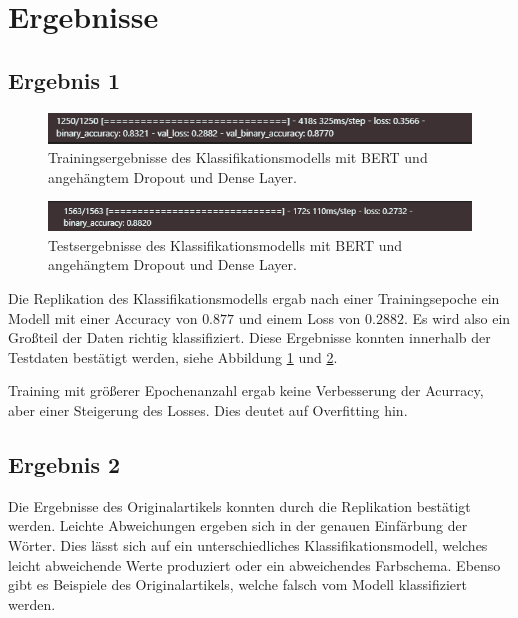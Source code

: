 \documentclass[DIV=13,fontsize=11pt]{scrartcl}
\begin{document}
\section{Ergebnisse}

\subsection{Ergebnis 1}

\begin{figure}[H]
    \centering
    \includegraphics[width=\linewidth]{img/train_time.png}
    \caption{Trainingsergebnisse des Klassifikationsmodells mit BERT und angehängtem Dropout und Dense Layer.}
    \label{fig:modell_train}
\end{figure}

\begin{figure}[H]
    \centering
    \includegraphics[width=\linewidth]{img/test_time.png}
    \caption{Testsergebnisse des Klassifikationsmodells mit BERT und angehängtem Dropout und Dense Layer.}
    \label{fig:modell_test}
\end{figure}

Die Replikation des Klassifikationsmodells ergab nach einer Trainingsepoche ein Modell mit einer Accuracy von $0.877$ und
einem Loss von $0.2882$. Es wird also ein Großteil der Daten richtig klassifiziert. Diese Ergebnisse konnten innerhalb
der Testdaten bestätigt werden, siehe Abbildung \ref{fig:modell_train} und \ref{fig:modell_test}.

Training mit größerer Epochenanzahl ergab keine Verbesserung der Acurracy, aber einer Steigerung des Losses. Dies
deutet auf Overfitting hin.

\subsection{Ergebnis 2}

Die Ergebnisse des Originalartikels konnten durch die Replikation bestätigt werden. Leichte Abweichungen
ergeben sich in der genauen Einfärbung der Wörter. Dies lässt sich auf ein unterschiedliches Klassifikationsmodell,
welches leicht abweichende Werte produziert oder ein abweichendes Farbschema.
Ebenso gibt es Beispiele des Originalartikels, welche falsch vom Modell klassifiziert werden.\\
\end{document}
